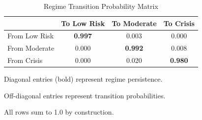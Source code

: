 \begin{table}[H]
\centering
\caption{Regime Transition Probability Matrix}
\label{tab:transition_matrix}
\small
\begin{tabular}{lccc}
\toprule
 & To Low Risk & To Moderate & To Crisis \\
\midrule
From Low Risk & \textbf{0.997} & 0.003 & 0.000 \\
From Moderate & 0.000 & \textbf{0.992} & 0.008 \\
From Crisis & 0.000 & 0.020 & \textbf{0.980} \\
\bottomrule
\end{tabular}
\begin{tablenotes}
\small
\item Diagonal entries (bold) represent regime persistence.
\item Off-diagonal entries represent transition probabilities.
\item All rows sum to 1.0 by construction.
\end{tablenotes}
\end{table}